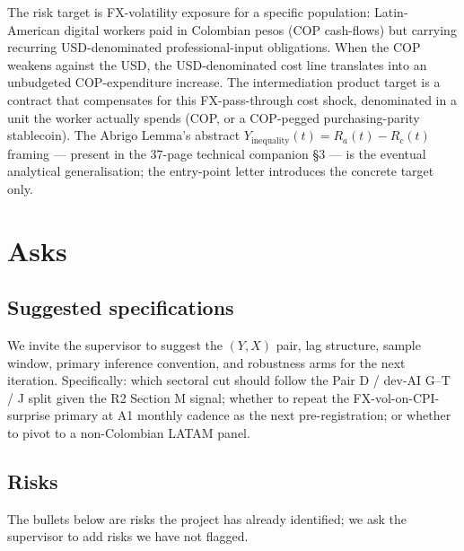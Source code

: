 The risk target is FX-volatility exposure for a specific population: Latin-American digital workers paid in Colombian pesos (COP cash-flows) but carrying recurring USD-denominated professional-input obligations. When the COP weakens against the USD, the USD-denominated cost line translates into an unbudgeted COP-expenditure increase. The intermediation product target is a contract that compensates for this FX-pass-through cost shock, denominated in a unit the worker actually spends (COP, or a COP-pegged purchasing-parity stablecoin). The Abrigo Lemma's abstract \(Y_{\mathrm{inequality}}(t) = R_a(t) - R_c(t)\) framing --- present in the 37-page technical companion \S3 --- is the eventual analytical generalisation; the entry-point letter introduces the concrete target only.

\section{Asks}\label{sec:4}

\subsection{Suggested specifications}\label{sec:4-specs}

We invite the supervisor to suggest the \((Y, X)\) pair, lag structure, sample window, primary inference convention, and robustness arms for the next iteration. Specifically: which sectoral cut should follow the Pair D / dev-AI G--T / J split given the R2 Section M signal; whether to repeat the FX-vol-on-CPI-surprise primary at A1 monthly cadence as the next pre-registration; or whether to pivot to a non-Colombian LATAM panel.

\subsection{Risks}\label{sec:4-risks}

The bullets below are risks the project has already identified; we ask the supervisor to add risks we have not flagged.

